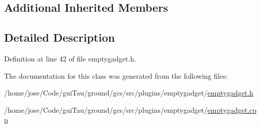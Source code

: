 \subsection*{Additional Inherited Members}


\subsection{Detailed Description}


Definition at line 42 of file emptygadget.\-h.



The documentation for this class was generated from the following files\-:\begin{DoxyCompactItemize}
\item 
/home/jose/\-Code/gui\-Tau/ground/gcs/src/plugins/emptygadget/\hyperlink{emptygadget_8h}{emptygadget.\-h}\item 
/home/jose/\-Code/gui\-Tau/ground/gcs/src/plugins/emptygadget/\hyperlink{emptygadget_8cpp}{emptygadget.\-cpp}\end{DoxyCompactItemize}

